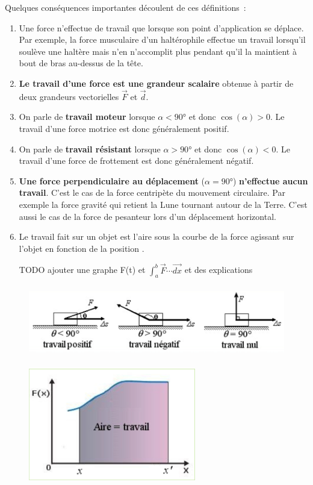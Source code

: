 Quelques conséquences importantes découlent de ces définitions~:
\begin{enumerate}
\item   Une force n'effectue de travail que lorsque son point d'application se
  déplace. Par exemple, la force
musculaire d'un haltérophile effectue un travail lorsqu'il soulève une
haltère mais n'en n'accomplit
plus pendant qu'il la maintient à bout de bras au-dessus de la tête.
\item   \textbf{Le travail d'une force est une grandeur scalaire} obtenue à
  partir de deux grandeurs vectorielles $\vec{F}$ et  $\vec{d}$.
\item   On parle de \textbf{travail moteur} lorsque $\alpha < 90°$ et donc
  $ \cos(\alpha) > 0$. Le travail d'une force motrice est donc 
  généralement positif.
\item   On parle de \textbf{travail résistant} lorsque $\alpha > 90°$ et
  donc $\cos(\alpha) < 0$. Le travail d'une force de frottement est 
  donc généralement négatif.
\item   \textbf{Une force perpendiculaire au déplacement} ($\alpha = 90°$)
  \textbf{n'effectue aucun travail}.
C'est le cas de la force centripète du mouvement circulaire. Par exemple la 
force gravité qui retient la Lune tournant autour de la Terre. C'est aussi le cas 
de la force de pesanteur lors d'un déplacement horizontal.
\item   Le travail fait sur un objet est l'aire sous la courbe de la force
  agissant sur l'objet en fonction de la position .

  TODO ajouter une graphe F(t) et $\int_a^b \vec{F} \cdots \vec{dx}$ et des explications 
  
\end{enumerate}


\begin{figure}
\centering
\includegraphics[width=12.989cm,height=3.115cm]{Pictures/1000000100000709000001B0D92B14C6C126C9B7.png}
\caption{}
\end{figure}

\begin{figure}
\centering
\includegraphics[width=7.292cm,height=4.895cm]{Pictures/100000010000031F00000218321A1B2B64E50C1E.png}
\caption{}
\end{figure}

